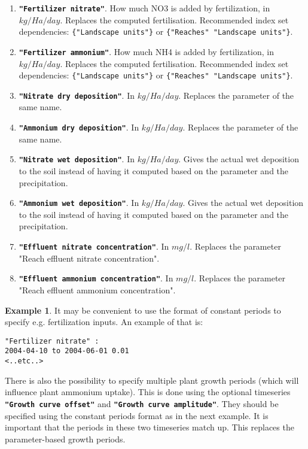 \documentclass[11pt]{article}
\theoremstyle{definition}
\newtheorem{myexample}{Example}
\newenvironment{example}%
  {\begin{lrbox}{\examplebox}%
   \begin{minipage}{\dimexpr\linewidth-2\fboxsep}
   \begin{myexample}}%
  {\end{myexample}%
   \end{minipage}%
   \end{lrbox}%
   \begin{trivlist}
     \item[]\colorbox{silver}{\usebox\examplebox}
   \end{trivlist}}
\begin{document}
\begin{enumerate}[i]
\item {\bf\tt "Fertilizer nitrate"}. How much NO3 is added by fertilization, in $kg/Ha/day$. Replaces the computed fertilisation. Recommended index set dependencies: {\tt \{"Landscape units"\}} or {\tt \{"Reaches" "Landscape units"\}}.
\item {\bf\tt "Fertilizer ammonium"}. How much NH4 is added by fertilization, in $kg/Ha/day$. Replaces the computed fertilisation. Recommended index set dependencies: {\tt \{"Landscape units"\}} or {\tt \{"Reaches" "Landscape units"\}}.
\item {\bf\tt "Nitrate dry deposition"}. In $kg/Ha/day$. Replaces the parameter of the same name.
\item {\bf\tt "Ammonium dry deposition"}. In $kg/Ha/day$. Replaces the parameter of the same name.
\item {\bf\tt "Nitrate wet deposition"}. In $kg/Ha/day$. Gives the actual wet deposition to the soil instead of having it computed based on the parameter and the precipitation.
\item {\bf\tt "Ammonium wet deposition"}. In $kg/Ha/day$. Gives the actual wet deposition to the soil instead of having it computed based on the parameter and the precipitation.
\item {\bf\tt "Effluent nitrate concentration"}. In $mg/l$. Replaces the parameter "Reach effluent nitrate concentration".
\item {\bf\tt "Effluent ammonium concentration"}. In $mg/l$. Replaces the parameter "Reach effluent ammonium concentration".
\end{enumerate}

\begin{example}
It may be convenient to use the format of constant periods to specify e.g. fertilization inputs. An example of that is:
\begin{lstlisting}
"Fertilizer nitrate" :
2004-04-10 to 2004-06-01 0.01
<..etc..>
\end{lstlisting}
\end{example}

There is also the possibility to specify multiple plant growth periods (which will influence plant ammonium uptake). This is done using the optional timeseries {\tt\bf "Growth curve offset"} and {\tt\bf "Growth curve amplitude"}. They should be specified using the constant periods format as in the next example. It is important that the periods in these two timeseries match up. This replaces the parameter-based growth periods.
\end{document}
